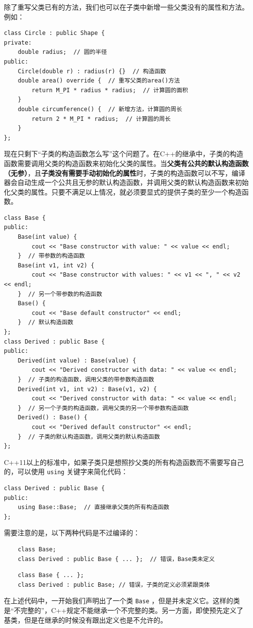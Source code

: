 除了重写父类已有的方法，我们也可以在子类中新增一些父类没有的属性和方法。例如：
\begin{verbatim}
class Circle : public Shape {
private:
    double radius;  // 圆的半径
public:
    Circle(double r) : radius(r) {}  // 构造函数
    double area() override {  // 重写父类的area()方法
        return M_PI * radius * radius;  // 计算圆的面积
    }
    double circumference() {  // 新增方法，计算圆的周长
        return 2 * M_PI * radius;  // 计算圆的周长
    }
};
\end{verbatim}

现在只剩下“子类的构造函数怎么写”这个问题了。在C++的继承中，子类的构造函数需要调用父类的构造函数来初始化父类的属性。当\textbf{父类有公共的默认构造函数（无参）}，且\textbf{子类没有需要手动初始化的属性}时，子类的构造函数可以不写，编译器会自动生成一个公共且无参的默认构造函数，并调用父类的默认构造函数来初始化父类的属性。只要不满足以上情况，就必须要显式的提供子类的至少一个构造函数。
\begin{verbatim}
class Base {
public:
    Base(int value) {
        cout << "Base constructor with value: " << value << endl;
    }  // 带参数的构造函数
    Base(int v1, int v2) {
        cout << "Base constructor with values: " << v1 << ", " << v2 << endl;
    }  // 另一个带参数的构造函数
    Base() {
        cout << "Base default constructor" << endl;
    }  // 默认构造函数
};
class Derived : public Base {
public:
    Derived(int value) : Base(value) {
        cout << "Derived constructor with data: " << value << endl;
    }  // 子类的构造函数，调用父类的带参数构造函数
    Derived(int v1, int v2) : Base(v1, v2) {
        cout << "Derived constructor with data: " << value << endl;
    }  // 另一个子类的构造函数，调用父类的另一个带参数构造函数
    Derived() : Base() {
        cout << "Derived default constructor" << endl;
    }  // 子类的默认构造函数，调用父类的默认构造函数
};
\end{verbatim}

C++11以上的标准中，如果子类只是想照抄父类的所有构造函数而不需要写自己的，可以使用 \texttt{using} 关键字来简化代码：
\begin{verbatim}
class Derived : public Base {
public:
    using Base::Base;  // 直接继承父类的所有构造函数
};
\end{verbatim}

需要注意的是，以下两种代码是不过编译的：
\begin{verbatim}
    class Base;
    class Derived : public Base { ... };  // 错误，Base类未定义
\end{verbatim}
\begin{verbatim}
    class Base { ... };
    class Derived : public Base; // 错误，子类的定义必须紧跟类体
\end{verbatim}
在上述代码中，一开始我们声明出了一个类 \texttt{Base} ，但是并未定义它。这样的类是“不完整的”，C++规定不能继承一个不完整的类。另一方面，即使预先定义了基类，但是在继承的时候没有跟出定义也是不允许的。

